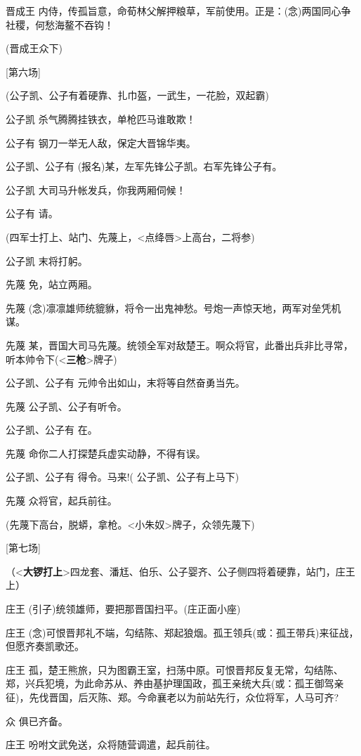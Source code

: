 晋成王
内侍，传孤旨意，命荀林父解押粮草，军前使用。正是：(念)两国同心争社稷，何愁海鳌不吞钩！

(晋成王众下)

{[}第六场{]}

(公子凯、公子有着硬靠、扎巾盔，一武生，一花脸，双起霸)

公子凯 杀气腾腾挂铁衣，单枪匹马谁敢欺！

公子有 钢刀一举无人敌，保定大晋锦华夷。

公子凯、公子有 (报名)某，左军先锋公子凯。右军先锋公子有。

公子凯 大司马升帐发兵，你我两厢伺候！

公子有 请。

(四军士打上、站门、先蔑上，\textless{}点绛唇\textgreater{}上高台，二将参)

公子凯 末将打躬。

先蔑 免，站立两厢。

先蔑
(念)凛凛雄师统貔貅，将令一出鬼神愁。号炮一声惊天地，两军对垒凭机谋。

先蔑
某，晋国大司马先蔑。统领全军对敌楚王。啊众将官，此番出兵非比寻常，听本帅令下(\textless{}\textbf{三枪}\textgreater{}牌子)

公子凯、公子有 元帅令出如山，末将等自然奋勇当先。

先蔑 公子凯、公子有听令。

公子凯、公子有 在。

先蔑 命你二人打探楚兵虚实动静，不得有误。

公子凯、公子有 得令。马来!( 公子凯、公子有上马下)

先蔑 众将官，起兵前往。

(先蔑下高台，脱蟒，拿枪。\textless{}小朱奴\textgreater{}牌子，众领先蔑下)

{[}第七场{]}

（\textless{}\textbf{大锣打上}\textgreater{}四龙套、潘尪、伯乐、公子婴齐、公子侧四将着硬靠，站门，庄王上）

庄王 (引子)统领雄师，要把那晋国扫平。(庄正面小座)

庄王
(念)可恨晋邦礼不端，勾结陈、郑起狼烟。孤王领兵(或：孤王带兵)来征战，但愿齐奏凯歌还。

庄王
孤，楚王熊旅，只为图霸王室，扫荡中原。可恨晋邦反复无常，勾结陈、郑，兴兵犯境，为此命苏从、养由基护理国政，孤王亲统大兵(或：孤王御驾亲征)，先伐晋国，后灭陈、郑。今命襄老以为前站先行，众位将军，人马可齐?

众 俱已齐备。

庄王 吩咐文武免送，众将随营调遣，起兵前往。

